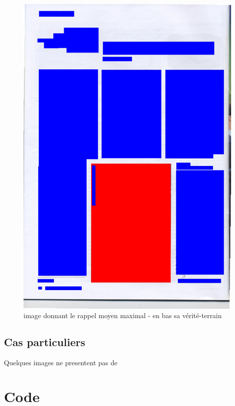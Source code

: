 \documentclass{book}
\begin{document}
\begin{figure}[H]
\begin{center}
\includegraphics[scale=0.25]{images/50_m.jpg}
\end{center}
\caption{image donnant le rappel moyen maximal - en bas sa vérité-terrain}
\label{meilleur_rappel}
\end{figure}

\clearpage

\section{Cas particuliers}

Quelques images ne presentent pas de
\clearpage

\chapter{Code}
\end{document}
